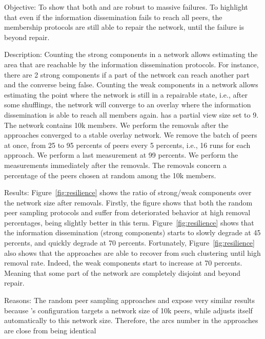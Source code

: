 \begin{asparadesc}
\item[Objective:] To show that both \SPRAY and \CYCLON are robust to massive
   failures. To highlight that even if the information
  dissemination fails to reach all peers, the membership protocols are still
  able to repair the network, until the failure is beyond repair.
\item[Description:] Counting the strong components in a network allows
  estimating the area that are reachable by the information dissemination
  protocols. For instance, there are 2 strong components if a part of the
  network can reach another part and the converse being false.  Counting the
  weak components in a network allows estimating the point where the network is
  still in a repairable state, i.e., after some shufflings, the network will
  converge to an overlay where the information dissemination is able to reach
  all members again. \CYCLON has a partial view size set to 9. The network
  contains 10k members. We perform the removals after the approaches converged
  to a stable overlay network. We remove the batch of peers at once, from 25 to
  95 percents of peers every 5 percents, i.e., 16 runs for each approach. We
  perform a last measurement at 99 percents. We perform the measurements
  immediately after the removals. The removals concern a percentage of the
  peers chosen at random among the 10k members.
\item[Results:] Figure~\ref{fig:resilience} shows the ratio of strong/weak
  components over the network size after removals. Firstly, the figure shows
  that both the random peer sampling protocols \SPRAY and \CYCLON suffer from
  deteriorated behavior at high removal percentages, \CYCLON being slightly
  better in this term. Figure~\ref{fig:resilience} shows that the information
  dissemination (strong components) starts to slowly degrade at 45 percents,
  and quickly degrade at 70 percents. Fortunately, Figure~\ref{fig:resilience}
  also shows that the approaches are able to recover from such clustering until
  high removal rate. Indeed, the weak components start to increase at 70
  percents. Meaning that some part of the network are completely disjoint and
  beyond repair.
\item[Reasons:] The random peer sampling approaches \CYCLON and \SPRAY expose
  very similar results because \CYCLON's configuration targets a network size
  of 10k peers, while \SPRAY adjusts itself automatically to this network size.
  Therefore, the arcs number in the approaches are close from being identical

\end{asparadesc}
